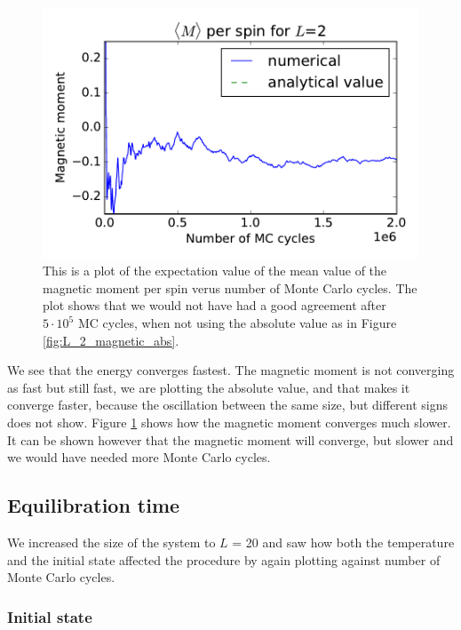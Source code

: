 \begin{figure}[H]
\includegraphics[width=\linewidth]{../results/4b/L_2_magnetic}\caption{This is a plot of the expectation value of the mean value of the magnetic moment per spin verus number of Monte Carlo cycles. The plot shows that we would not have had a good agreement after $ 5 \cdot 10^{5} $ MC cycles, when not using the absolute value as in Figure \ref{fig:L_2_magnetic_abs}.}\label{fig:L_2_magnetic}
\end{figure}


We see that the energy converges fastest. The magnetic moment is not converging as fast but still fast, we are plotting the absolute value, and that makes it converge faster, because the oscillation between the same size, but different signs does not show. Figure \ref{fig:L_2_magnetic} shows how the magnetic moment converges much slower. It can be shown however that the magnetic moment will converge, but slower and we would have needed more Monte Carlo cycles. 

\subsection{Equilibration time}

We increased the size of the system to $L$ = 20 and saw how both the temperature and the initial state affected the procedure by again plotting against number of Monte Carlo cycles. %


\subsubsection{Initial state}

